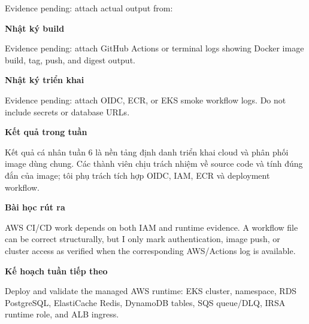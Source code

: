 Evidence pending: attach actual output from:

\begin{Shaded}
\begin{Highlighting}[]
\end{Highlighting}
\end{Shaded}

\vspace{0.5em}\noindent\textbf{Nhật ký build}\par

Evidence pending: attach GitHub Actions or terminal logs showing Docker
image build, tag, push, and digest output.

\vspace{0.5em}\noindent\textbf{Nhật ký triển
khai}\par

Evidence pending: attach OIDC, ECR, or EKS smoke workflow logs. Do not
include secrets or database URLs.

\vspace{0.5em}\noindent\textbf{Kết quả trong tuần}\par

Kết quả cá nhân tuần 6 là nền tảng định danh triển khai cloud và phân
phối image dùng chung. Các thành viên chịu trách nhiệm về source code và
tính đúng đắn của image; tôi phụ trách tích hợp OIDC, IAM, ECR và
deployment workflow.

\vspace{0.5em}\noindent\textbf{Bài học rút ra}\par

AWS CI/CD work depends on both IAM and runtime evidence. A workflow file
can be correct structurally, but I only mark authentication, image push,
or cluster access as verified when the corresponding AWS/Actions log is
available.

\vspace{0.5em}\noindent\textbf{Kế hoạch tuần tiếp
theo}\par

Deploy and validate the managed AWS runtime: EKS cluster, namespace, RDS
PostgreSQL, ElastiCache Redis, DynamoDB tables, SQS queue/DLQ, IRSA
runtime role, and ALB ingress.
